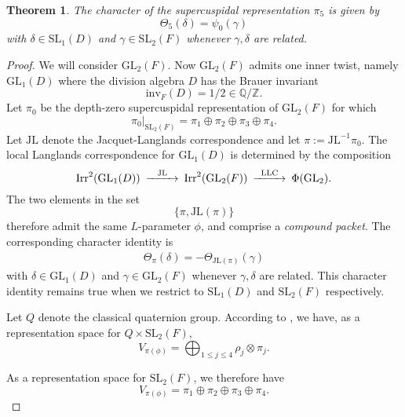 \documentclass[11pt]{amsart}
\numberwithin{equation}{section}
\newtheorem{thm}[equation]{Theorem}
\def\LLC{\mathrm{LLC}}
\def\Irr{\mathrm{Irr}}
\def\JL{\mathfrak{JL}}
\def\JL{\mathrm{JL}}
\def\GL{\mathrm{GL}}
\def\Z{\mathbb{Z}}
\def\Q{\mathbb{Q}}
\def\SL{\mathrm{SL}}
\def\LLC{\mathrm{{LLC}}}
\newcommand{\<}{\left\langle}
\renewcommand{\>}{\right\rangle}
\begin{document}
\begin{thm}\label{Theta_5} The character of the supercuspidal representation $\pi_5$  is given by
\[
\Theta_5(\delta) = \psi_0(\gamma)\]
with $\delta \in \SL_1(D)$ and $\gamma \in \SL_2(F)$ whenever $\gamma, \delta$ are related.  
\end{thm} 
\begin{proof}  We will consider $\GL_2(F)$.   Now $\GL_2(F)$ admits one inner twist, namely $\GL_1(D)$ where the division algebra $D$ has the Brauer invariant
\[
\mathrm{inv}_F (D) = 1/2 \in \Q/ \Z.
\]
Let $\pi_0$ be the depth-zero supercuspidal representation of $\GL_2(F)$ for which
 \[
 \pi_0 |_{\SL_2(F)} = \pi_1 \oplus \pi_2 \oplus \pi_3 \oplus \pi_4.
 \]
 Let $\JL$ denote the Jacquet-Langlands correspondence and let 
$\pi := \mathrm{JL}^{-1} \pi_0$.   The local Langlands correspondence for $\GL_1(D)$ is determined by the composition
 \[
 \begin{CD}
 \Irr^2(\GL_1(D)) @> \JL >> \Irr^2(\GL_2(F)) @> \LLC>> \Phi(\GL_2) .
 \end{CD}
 \]
The two elements in the set
\[
 \{\pi,  \JL(\pi) \}
\] 
therefore admit the same $L$-parameter $\phi$, and comprise a \emph{compound packet}.    The corresponding
character identity is
\begin{eqnarray}\label{chid}
\Theta_\pi (\delta)= - \Theta_{\JL(\pi)}(\gamma)
\end{eqnarray}
with $\delta \in \GL_1(D)$ and $\gamma \in \GL_2(F)$ whenever $\gamma, \delta$ are related.    This character identity remains true when we restrict to $\SL_1(D)$ and $\SL_2(F)$ respectively.   

Let $Q$ denote the classical quaternion group.   According to \cite[Lemma 12.6]{HS}, we have, as a representation space for $Q \times \SL_2(F)$, 
\[
V_{\pi(\phi)} = \bigoplus_{1 \leq j \leq 4}\rho_j \otimes \pi_j.
\]

As a representation space for $\SL_2(F)$, we therefore have
\[
V_{\pi(\phi)} = \pi_1 \oplus \pi_2 \oplus \pi_3 \oplus \pi_4.
\]


\end{proof}
\end{document}
